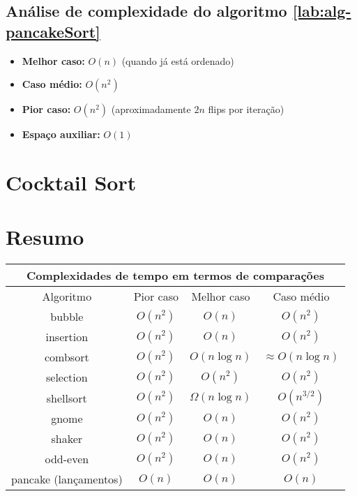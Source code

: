 \subsection{Análise de complexidade do algoritmo \ref{lab:alg-pancakeSort}}
\begin{itemize}
    \item \textbf{Melhor caso:} $O(n)$ (quando já está ordenado)
    \item \textbf{Caso médio:} $O(n^2)$
    \item \textbf{Pior caso:} $O(n^2)$ (aproximadamente $2n$ flips por iteração)
    \item \textbf{Espaço auxiliar:} $O(1)$
\end{itemize}


\section{Cocktail Sort}

\section{Resumo}

\begin{center}
\begin{tabular}{||c|c|c|c||}
\hline
\multicolumn{4}{|c|}{Complexidades de tempo em termos de comparações} \\
\hline
Algoritmo & Pior caso & Melhor caso & Caso médio \\
\hline
bubble      & $O(n^2)$       & $O(n)$          & $O(n^2)$ \\
insertion   & $O(n^2)$       & $O(n)$          & $O(n^2)$ \\
combsort    & $O(n^2)$       & $O(n\log n)$    & $\approx O(n \log n)$ \\
selection   & $O(n^2)$       & $O(n^2)$        & $O(n^2)$ \\
shellsort   & $O(n^2)$       & $\Omega(n\log n)$ & $O(n^{3/2})$ \\
gnome       & $O(n^2)$       & $O(n)$          & $O(n^2)$ \\
shaker      & $O(n^2)$       & $O(n)$          & $O(n^2)$ \\
odd-even    & $O(n^2)$       & $O(n)$          & $O(n^2)$ \\
pancake (lançamentos)     & $O(n)$  & $O(n)$  & $O(n)$  \\
\hline
\end{tabular}
\end{center}

